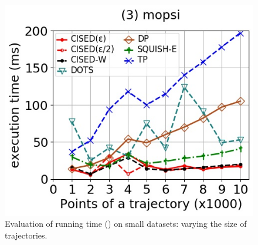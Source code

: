 {\begin{figure}[tb!]
	\includegraphics[scale=0.348]{Figures/Exp-SED-time-size-mopsi.jpg}	
	\vspace{-2ex}
	\caption{\small Evaluation of running time (\sed) on small datasets: varying the size of trajectories.}\label{fig:time-size-sed}
	\vspace{-2ex}
\end{figure}

}
